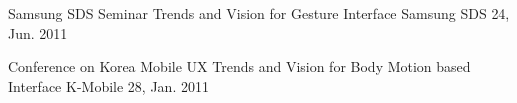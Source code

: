 \begin{cventries}
  \cventry
    {Samsung SDS Seminar} %
    {Trends and Vision for Gesture Interface} %
    {Samsung SDS} %
    {24, Jun. 2011} %
    {}
    
  \cventry
    {Conference on Korea Mobile UX} %
    {Trends and Vision for Body Motion based Interface} %
    {K-Mobile} %
    {28, Jan. 2011} %
    {}
\end{cventries}
